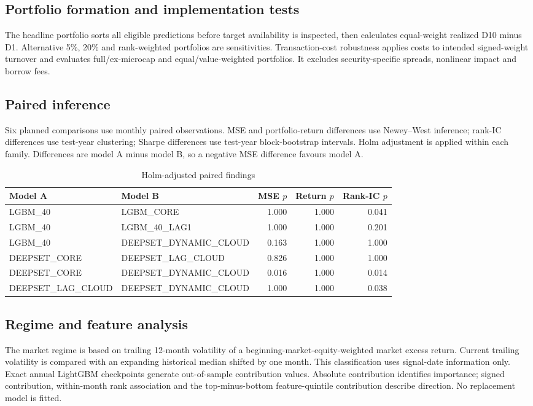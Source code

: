 \documentclass[11pt,a4paper]{article}
\begin{document}
\subsection{Portfolio formation and implementation tests}
The headline portfolio sorts all eligible predictions before target availability is inspected, then calculates equal-weight realized D10 minus D1. Alternative 5\%, 20\% and rank-weighted portfolios are sensitivities. Transaction-cost robustness applies costs to intended signed-weight turnover and evaluates full/ex-microcap and equal/value-weighted portfolios. It excludes security-specific spreads, nonlinear impact and borrow fees.

\subsection{Paired inference}
Six planned comparisons use monthly paired observations. MSE and portfolio-return differences use Newey--West inference; rank-IC differences use test-year clustering; Sharpe differences use test-year block-bootstrap intervals. Holm adjustment is applied within each family. Differences are model A minus model B, so a negative MSE difference favours model A.

\begin{table}[ht]
\centering\scriptsize
\caption{Holm-adjusted paired findings}
\begin{tabularx}{\linewidth}{XXrrr}
\toprule
Model A & Model B & MSE $p$ & Return $p$ & Rank-IC $p$ \\
\midrule
LGBM\_40 & LGBM\_CORE & 1.000 & 1.000 & 0.041 \\
LGBM\_40 & LGBM\_40\_LAG1 & 1.000 & 1.000 & 0.201 \\
LGBM\_40 & DEEPSET\_DYNAMIC\_CLOUD & 0.163 & 1.000 & 1.000 \\
DEEPSET\_CORE & DEEPSET\_LAG\_CLOUD & 0.826 & 1.000 & 1.000 \\
DEEPSET\_CORE & DEEPSET\_DYNAMIC\_CLOUD & 0.016 & 1.000 & 0.014 \\
DEEPSET\_LAG\_CLOUD & DEEPSET\_DYNAMIC\_CLOUD & 1.000 & 1.000 & 0.038 \\
\bottomrule
\end{tabularx}
\end{table}

\subsection{Regime and feature analysis}
The market regime is based on trailing 12-month volatility of a beginning-market-equity-weighted market excess return. Current trailing volatility is compared with an expanding historical median shifted by one month. This classification uses signal-date information only. Exact annual LightGBM checkpoints generate out-of-sample contribution values. Absolute contribution identifies importance; signed contribution, within-month rank association and the top-minus-bottom feature-quintile contribution describe direction. No replacement model is fitted.
\end{document}
